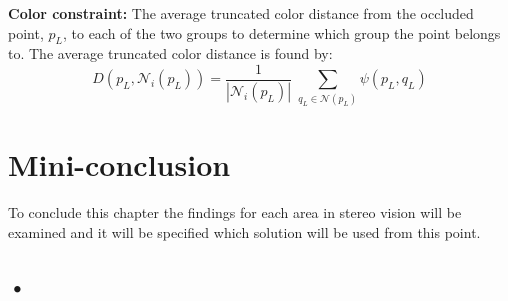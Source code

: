 \textbf{Color constraint:} The average truncated color distance from the occluded point, $p_L$, to each of the two groups to determine which group the point belongs to. The average truncated color distance is found by:
\begin{equation}
D(p_L,\mathcal{N}_i(p_L) ) = \dfrac{1}{|\mathcal{N}_i(p_L)|} \; \sum_{q_L \in \mathcal{N}(p_L)} \psi (p_L,q_L)
\end{equation}

\section{Mini-conclusion}
To conclude this chapter the findings for each area in stereo vision will be examined and it will be specified which solution will be used from this point.
\subsection*{•}
